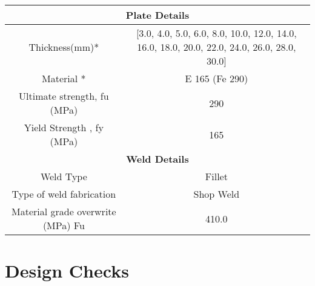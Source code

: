 \documentclass{article}%
\begin{document}
\begin{longtable}{|p{5cm}|p{2cm}|p{2cm}|p{2cm}|p{5cm}|}
\hline%
\hline%
\multicolumn{5}{|c|}{\textbf{Plate Details}}\\%
\hline%
\hline%
\multicolumn{3}{|c|}{Thickness(mm)*}&\multicolumn{2}{|c|}{{[}3.0, 4.0, 5.0, 6.0, 8.0, 10.0, 12.0, 14.0, 16.0, 18.0, 20.0, 22.0, 24.0, 26.0, 28.0, 30.0{]}}\\%
\hline%
\hline%
\multicolumn{3}{|c|}{Material *}&\multicolumn{2}{|c|}{E 165 (Fe 290)}\\%
\hline%
\hline%
\multicolumn{3}{|c|}{Ultimate strength, fu (MPa)}&\multicolumn{2}{|c|}{290}\\%
\hline%
\hline%
\multicolumn{3}{|c|}{Yield Strength , fy (MPa)}&\multicolumn{2}{|c|}{165}\\%
\hline%
\hline%
\multicolumn{5}{|c|}{\textbf{Weld Details}}\\%
\hline%
\hline%
\multicolumn{3}{|c|}{Weld Type}&\multicolumn{2}{|c|}{Fillet}\\%
\hline%
\hline%
\multicolumn{3}{|c|}{Type of weld fabrication}&\multicolumn{2}{|c|}{Shop Weld}\\%
\hline%
\hline%
\multicolumn{3}{|c|}{Material grade overwrite (MPa) Fu}&\multicolumn{2}{|c|}{410.0}\\%
\hline%
\end{longtable}

%
%
\newpage%
\section{Design Checks}%
\label{sec:DesignChecks}%
\end{document}
